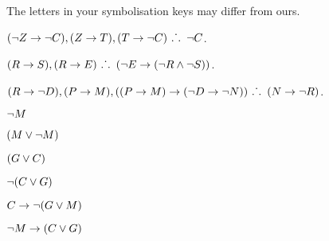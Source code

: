 \documentclass[PHIL101-Textbook.tex]{subfiles}
\begin{document}
The letters in your symbolisation keys may differ from ours.
\begin{earg}
\item $(\neg Z \rightarrow \neg C), (Z \rightarrow T), (T \rightarrow \neg C)\ \ldotp\dot{}\,\ldotp \ \neg C$. %

\item $(R \eif S), (R \eif E) \ \therefore \ (\enot E \eif (\enot R \eand \enot S))$. %

\item $(R \rightarrow \neg D), (P \rightarrow M), ((P \rightarrow M) \rightarrow (\neg D \rightarrow \neg N)) \ \ldotp\dot{}\,\ldotp \ (N \rightarrow \neg R)$. %
\end{earg}


\begin{earg}
\item $\neg M$
\item $(M \vee \neg M)$
\item $(G \vee C)$
\item $\neg (C \vee G)$
\item $C \rightarrow \neg( G \vee M)$
\item $\neg M \rightarrow (C \vee G)$
\end{earg}
\end{document}
